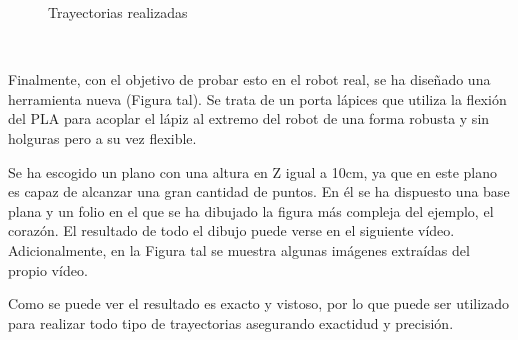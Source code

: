 \begin{figure} [ht!]
    \centering  
    \hspace{2cm}
    \hspace{2cm}
    \hspace{2cm}
    \caption{Trayectorias realizadas}
    \label{fig:trayectorias}
\end{figure}\ 

Finalmente, con el objetivo de probar esto en el robot real, se ha diseñado una herramienta nueva (Figura tal). Se trata de un porta lápices que utiliza la 
flexión del PLA para acoplar el lápiz al extremo del robot de una forma robusta y sin holguras pero a su vez flexible.


Se ha escogido un plano con una altura en Z igual a 10cm, ya que en este plano es capaz de alcanzar una gran cantidad de puntos. En él se ha dispuesto 
una base plana y un folio en el que se ha dibujado la figura más compleja del ejemplo, el corazón. El resultado de todo el dibujo puede verse en el siguiente 
vídeo. Adicionalmente, en la Figura tal se muestra algunas imágenes extraídas del propio vídeo.


Como se puede ver el resultado es exacto y vistoso, por lo que puede ser utilizado para realizar todo tipo de trayectorias asegurando exactidud y precisión.
